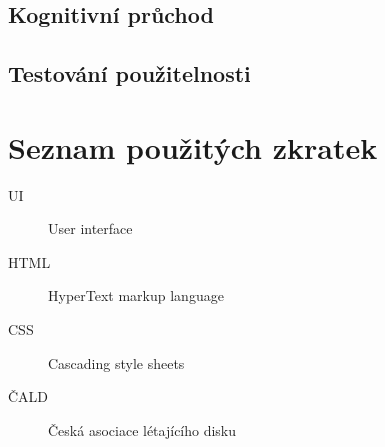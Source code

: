 \documentclass[thesis=B,czech]{FITthesis}[2012/06/26]
\begin{document}
	\section{Kognitivní průchod}

	\section{Testování použitelnosti}

\begin{conclusion}
\end{conclusion}




\appendix

\chapter{Seznam použitých zkratek}
\begin{description}
	\item[UI] User interface
	\item[HTML] HyperText markup language
	\item[CSS] Cascading style sheets
	\item[ČALD] Česká asociace létajícího disku
\end{description}
\end{document}
